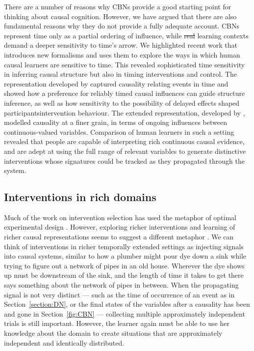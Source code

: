 \documentclass{cambridge7A}%
\providecommand{\DIFadd}[1]{{\protect\color{blue}\uwave{#1}}} %
\providecommand{\DIFdel}[1]{{\protect\color{red}\sout{#1}}}                      %
\providecommand{\DIFaddbegin}{} %
\providecommand{\DIFaddend}{} %
\providecommand{\DIFdelbegin}{} %
\providecommand{\DIFdelend}{} %
\newcommand{\DIFscaledelfig}{0.5}
\newlength{\DIFdelgraphicswidth} %
\newlength{\DIFdelgraphicsheight} %
\newcommand{\DIFaddincludegraphics}[2][]{{\color{blue}\fbox{\DIFOincludegraphics[#1]{#2}}}} %
\newcommand{\DIFdelincludegraphics}[2][]{%
\sbox{\DIFdelgraphicsbox}{\DIFOincludegraphics[#1]{#2}}%
\settoboxwidth{\DIFdelgraphicswidth}{\DIFdelgraphicsbox} %
\settoboxtotalheight{\DIFdelgraphicsheight}{\DIFdelgraphicsbox} %
\scalebox{\DIFscaledelfig}{%
\parbox[b]{\DIFdelgraphicswidth}{\usebox{\DIFdelgraphicsbox}\\[-\baselineskip] \rule{\DIFdelgraphicswidth}{0em}}\llap{\resizebox{\DIFdelgraphicswidth}{\DIFdelgraphicsheight}{%
\setlength{\unitlength}{\DIFdelgraphicswidth}%
\begin{picture}(1,1)%
\thicklines\linethickness{2pt} %
{\color[rgb]{1,0,0}\put(0,0){\framebox(1,1){}}}%
{\color[rgb]{1,0,0}\put(0,0){\line( 1,1){1}}}%
{\color[rgb]{1,0,0}\put(0,1){\line(1,-1){1}}}%
\end{picture}%
}\hspace*{3pt}}} %
} %
\DeclareRobustCommand{\DIFaddbegin}{\DIFOaddbegin \let\includegraphics\DIFaddincludegraphics} %
\DeclareRobustCommand{\DIFaddend}{\DIFOaddend \let\includegraphics\DIFOincludegraphics} %
\DeclareRobustCommand{\DIFdelbegin}{\DIFOdelbegin \let\includegraphics\DIFdelincludegraphics} %
\DeclareRobustCommand{\DIFdelend}{\DIFOaddend \let\includegraphics\DIFOincludegraphics} %
\begin{document}
There are a number of reasons why CBNs provide a good starting point for thinking about causal cognition.  However, we have argued that there are also fundamental reasons why they do not provide a fully adequate account.  CBNs represent time only as a partial ordering of influence, while \DIFdelbegin \DIFdel{real }\DIFdelend \DIFaddbegin \DIFadd{real-world }\DIFaddend learning contexts demand a deeper sensitivity to time's arrow.  We highlighted recent work that introduces new formalisms and uses them to explore the ways in which human causal learners are sensitive to time.  This revealed sophisticated time sensitivity in inferring causal structure but also in timing interventions and control.  The representation developed by \cite{bramley2018time} captured causality relating events in time and showed how a preference for reliably timed causal influences can guide structure inference, as well as how sensitivity to the possibility of delayed effects shaped participants\DIFaddbegin \DIFadd{' }\DIFaddend intervention behaviour.  The extended representation, developed by \cite{davis2018ctcv}, modelled causality at a finer grain, in terms of ongoing influences between continuous-valued variables. Comparison of human learners in such a setting revealed that people are capable of interpreting rich continuous causal evidence, and are adept at using the full range of relevant variables to generate distinctive interventions whose signatures could be tracked as they propagated through the system.

\subsection{Interventions in rich domains}

Much of the work on intervention selection has used the metaphor of optimal experimental design \citep{fedorov1972theory}.  However, exploring richer interventions and learning of richer causal representations seems to suggest a different metaphor \citep{coenen2017asking}.  We can think of interventions in richer temporally extended settings as injecting signals into causal systems, similar to how a plumber might pour dye down a sink while trying to figure out a network of pipes in an old house.  Wherever the dye shows up must be downstream of the sink, and the length of time it takes to get there says something about the network of pipes in between.  When the propagating signal is not very distinct --- such as the time of occurrence of an event as in Section~\ref{section:DN}, or the final states of the variables after a causality has been and gone in Section~\ref{fig:CBN} --- collecting multiple approximately independent trials is still important.  However, the learner again must be able to use her knowledge about the domain to create situations that are approximately independent and identically distributed. 
\end{document}
